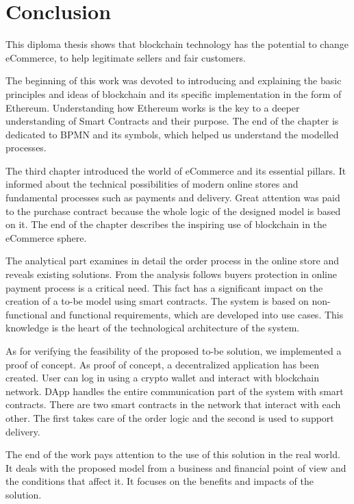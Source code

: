 \documentclass[thesis=M,english]{FITthesis}[2019/12/23]
\begin{document}
\chapter{Conclusion}



This diploma thesis shows that blockchain technology has the potential to change eCommerce, to help legitimate sellers and fair customers.

The beginning of this work was devoted to introducing and explaining the basic principles and ideas of blockchain and its specific implementation in the form of Ethereum. Understanding how Ethereum works is the key to a deeper understanding of Smart Contracts and their purpose. The end of the chapter is dedicated to BPMN and its symbols, which helped us understand the modelled processes.

The third chapter introduced the world of eCommerce and its essential pillars. It informed about the technical possibilities of modern online stores and fundamental processes such as payments and delivery. Great attention was paid to the purchase contract because the whole logic of the designed model is based on it. The end of the chapter describes the inspiring use of blockchain in the eCommerce sphere.

The analytical part examines in detail the order process in the online store and reveals existing solutions. From the analysis follows buyers protection in online payment process is a critical need. This fact has a significant impact on the creation of a to-be model using smart contracts. The system is based on non-functional and functional requirements, which are developed into use cases. This knowledge is the heart of the technological architecture of the system.

As for verifying the feasibility of the proposed to-be solution, we implemented a proof of concept. As proof of concept, a decentralized application has been created. User can log in using a crypto wallet and interact with blockchain network. DApp handles the entire communication part of the system with smart contracts. There are two smart contracts in the network that interact with each other. The first takes care of the order logic and the second is used to support delivery.

The end of the work pays attention to the use of this solution in the real world. It deals with the proposed model from a business and financial point of view and the conditions that affect it. It focuses on the benefits and impacts of the solution.
\end{document}
